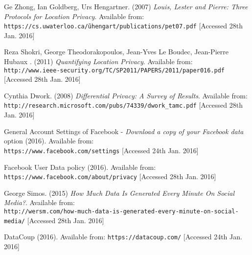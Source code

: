 \begin{thebibliography}{9}
Ge Zhong, Ian Goldberg, Urs Hengartner. (2007) \textit{Louis, Lester and Pierre: Three Protocols for Location Privacy}. Available from:
\\\texttt{https://cs.uwaterloo.ca/\~uhengart/publications/pet07.pdf}
[Accessed 28th Jan. 2016]

Reza Shokri, George Theodorakopoulos, Jean-Yves Le Boudec, Jean-Pierre Hubaux . (2011) \textit{Quantifying Location Privacy}. Available from:
\\\texttt{http://www.ieee-security.org/TC/SP2011/PAPERS/2011/paper016.pdf} [Accessed 28th Jan. 2016] 

Cynthia Dwork. (2008) \textit{Differential Privacy: A Survey of Results}. Available from:
\\\texttt{http://research.microsoft.com/pubs/74339/dwork\_tamc.pdf} [Accessed 28th Jan. 2016]


General Account Settings of Facebook - \textit{Download a copy of your Facebook data} option (2016). Available from:
\\\texttt{https://www.facebook.com/settings} [Accessed 24th Jan. 2016]

Facebook User Data policy (2016). Available from: 
\\\texttt{https://www.facebook.com/about/privacy} [Accessed 28th Jan. 2016]

George Simos. (2015) \textit{How Much Data Is Generated Every Minute On Social Media?}. Available from:
\\\texttt{http://wersm.com/how-much-data-is-generated-every-minute-on-social-media/} [Accessed 28th Jan. 2016]



DataCoup (2016). Available from: \texttt{https://datacoup.com/} [Accessed 24th Jan. 2016]


\end{thebibliography}
